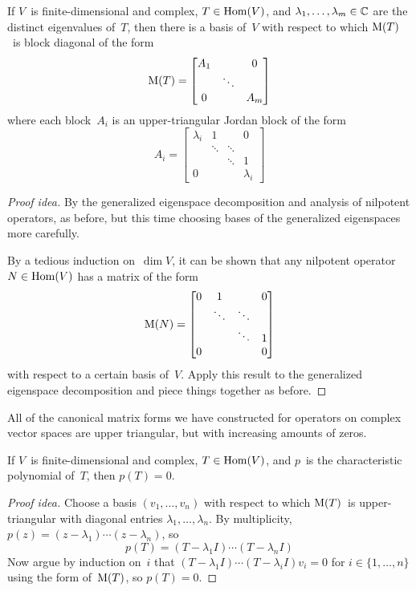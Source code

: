 \begin{thm}
If \(V\)~is finite-dimensional and complex, \(T\in\operatorname{Hom}(V)\), and \(\lambda_1,\ldots,\lambda_m\in\mathbb{C}\) are the distinct eigenvalues of~\(T\), then there is a basis of~\(V\) with respect to which \(\operatorname{M}(T)\)~is block diagonal of the form
\[\operatorname{M}(T)=\left[\begin{matrix}
A_1&&0\\
&\ddots&\\
0&&A_m
\end{matrix}\right]\]
where each block~\(A_i\) is an upper-triangular Jordan block of the form
\[A_i=\left[\begin{matrix}
\lambda_i&1&&0\\
&\ddots&\ddots&\\
&&\ddots&1\\
0&&&\lambda_i
\end{matrix}\right]\]
\end{thm}
\begin{proof}[Proof idea]
By the generalized eigenspace decomposition and analysis of nilpotent operators, as before, but this time choosing bases of the generalized eigenspaces more carefully.

By a tedious induction on~\(\dim V\), it can be shown that any nilpotent operator \(N\in\operatorname{Hom}(V)\) has a matrix of the form
\[\operatorname{M}(N)=\left[\begin{matrix}
0&1&&0\\
&\ddots&\ddots&\\
&&\ddots&1\\
0&&&0
\end{matrix}\right]\]
with respect to a certain basis of~\(V\). Apply this result to the generalized eigenspace decomposition and piece things together as before.
\end{proof}

\begin{rmk}
All of the canonical matrix forms we have constructed for operators on complex vector spaces are upper triangular, but with increasing amounts of zeros.
\end{rmk}

\begin{thm}
If \(V\)~is finite-dimensional and complex, \(T\in\operatorname{Hom}(V)\), and \(p\)~is the characteristic polynomial of~\(T\), then \(p(T)=0\).
\end{thm}
\begin{proof}[Proof idea]
Choose a basis \((v_1,\ldots,v_n)\) with respect to which \(\operatorname{M}(T)\)~is upper-triangular with diagonal entries \(\lambda_1,\ldots,\lambda_n\). By multiplicity, \(p(z)=(z-\lambda_1)\cdots(z-\lambda_n)\), so
\[p(T)=(T-\lambda_1 I)\cdots(T-\lambda_n I)\]
Now argue by induction on~\(i\) that \((T-\lambda_1 I)\cdots(T-\lambda_i I)v_i=0\) for \(i\in\{1,\ldots,n\}\) using the form of~\(\operatorname{M}(T)\), so \(p(T)=0\).
\end{proof}

